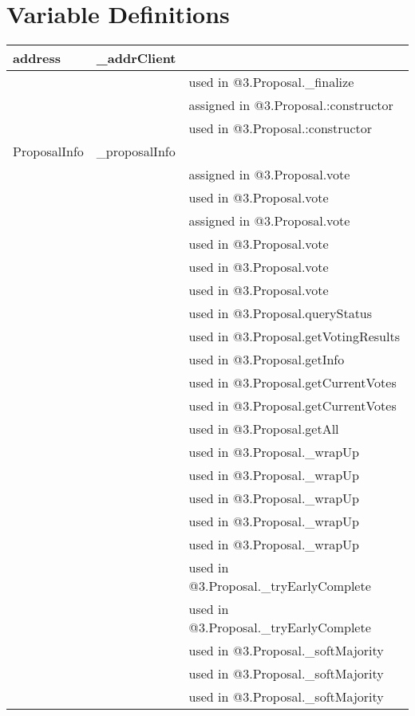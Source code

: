 \section{Variable Definitions}


\ifsoltables
\noindent\begin{tabular}{|l|l|p{5cm}|}\hline
address & \_{}addrClient &  \\\hline
 & & used in @3.Proposal.\_{}finalize\\\hline
 & & assigned in @3.Proposal.:constructor\\\hline
 & & used in @3.Proposal.:constructor\\\hline
ProposalInfo & \_{}proposalInfo &  \\\hline
 & & assigned in @3.Proposal.vote\\\hline
 & & used in @3.Proposal.vote\\\hline
 & & assigned in @3.Proposal.vote\\\hline
 & & used in @3.Proposal.vote\\\hline
 & & used in @3.Proposal.vote\\\hline
 & & used in @3.Proposal.vote\\\hline
 & & used in @3.Proposal.queryStatus\\\hline
 & & used in @3.Proposal.getVotingResults\\\hline
 & & used in @3.Proposal.getInfo\\\hline
 & & used in @3.Proposal.getCurrentVotes\\\hline
 & & used in @3.Proposal.getCurrentVotes\\\hline
 & & used in @3.Proposal.getAll\\\hline
 & & used in @3.Proposal.\_{}wrapUp\\\hline
 & & used in @3.Proposal.\_{}wrapUp\\\hline
 & & used in @3.Proposal.\_{}wrapUp\\\hline
 & & used in @3.Proposal.\_{}wrapUp\\\hline
 & & used in @3.Proposal.\_{}wrapUp\\\hline
 & & used in @3.Proposal.\_{}tryEarlyComplete\\\hline
 & & used in @3.Proposal.\_{}tryEarlyComplete\\\hline
 & & used in @3.Proposal.\_{}softMajority\\\hline
 & & used in @3.Proposal.\_{}softMajority\\\hline
 & & used in @3.Proposal.\_{}softMajority\\\hline

\end{tabular}
